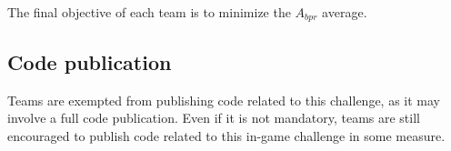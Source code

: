 



The final objective of each team is to minimize the $A_{bpr}$ average.

\subsection{Code publication}
Teams are exempted from publishing code related to this challenge, as it may involve a full code publication. Even if it is not mandatory, teams are still encouraged to publish code related to this in-game challenge in some measure.
